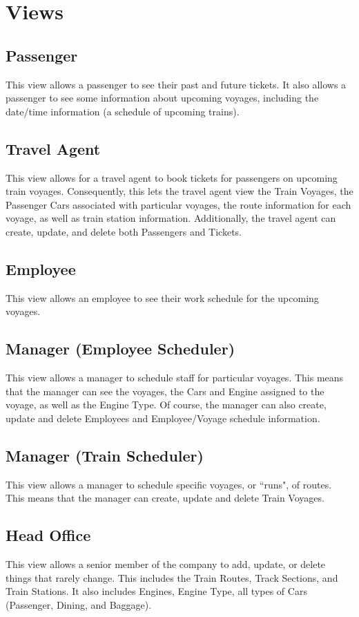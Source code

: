 \documentclass[a4paper]{article}
\begin{document}
\section{Views}
\subsection*{Passenger}
This view allows a passenger to see their past and future tickets. It also allows a passenger to see some information about upcoming voyages, including the date/time information (a schedule of upcoming trains).

\subsection*{Travel Agent}
This view allows for a travel agent to book tickets for passengers on upcoming train voyages. Consequently, this lets the travel agent view the Train Voyages, the Passenger Cars associated with particular voyages, the route information for each voyage, as well as train station information. Additionally, the travel agent can create, update, and delete both Passengers and Tickets.

\subsection*{Employee}
This view allows an employee to see their work schedule for the upcoming voyages.

\subsection*{Manager (Employee Scheduler)}
This view allows a manager to schedule staff for particular voyages. This means that the manager can see the voyages, the Cars and Engine assigned to the voyage, as well as the Engine Type. Of course, the manager can also create, update and delete Employees and Employee/Voyage schedule information.

\subsection*{Manager (Train Scheduler)}
This view allows a manager to schedule specific voyages, or ``runs", of routes. This means that the manager can create, update and delete Train Voyages.

\subsection*{Head Office}
This view allows a senior member of the company to add, update, or delete things that rarely change. This includes the Train Routes, Track Sections, and Train Stations. It also includes Engines, Engine Type, all types of Cars (Passenger, Dining, and Baggage).
\end{document}
